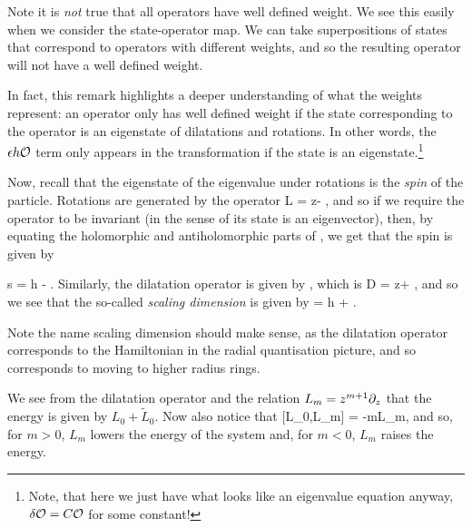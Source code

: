 \br 
Note it is \textit{not} true that all operators have well defined weight. We see this easily when we consider the state-operator map. We can take superpositions of states that correspond to operators with different weights, and so the resulting operator will not have a well defined weight. 
\er 

In fact, this remark highlights a deeper understanding of what the weights represent: an operator only has well defined weight if the state corresponding to the operator is an eigenstate of dilatations and rotations. In other words, the $\epsilon h\mathcal{O}$ term only appears in the transformation if the state is an eigenstate.\footnote{Note, that here we just have what looks like an eigenvalue equation anyway, $\delta \mathcal{O} = C\mathcal{O}$ for some constant!} 

Now, recall that the eigenstate of the eigenvalue under rotations is the \textit{spin} of the particle. Rotations are generated by the operator 
\bse 
    L = z\p - \overline{\p},
\ese 
and so if we require the operator to be invariant (in the sense of its state is an eigenvector), then, by equating the holomorphic and antiholomorphic parts of , we get that the spin is given by

\be 
\label{eqn:SpinWeights}
    s = h - .
\ee 
Similarly, the dilatation operator is given by , which is 
\bse 
    D = z\p + \overline{\p},
\ese
and so we see that the so-called \textit{scaling dimension} is given by 
\be 
\label{eqn:ScalingDimension}
    \Delta = h + .
\ee 

\br 
Note the name scaling dimension should make sense, as the dilatation operator corresponds to the Hamiltonian in the radial quantisation picture, and so corresponds to moving to higher radius rings. 
\er 

\br 
We see from the dilatation operator and the relation $L_m = z^{m+1}\partial_z$ that the energy is given by $L_0 +\widetilde{L}_0$. Now also notice that 
\be 
\label{eqn:L0LmCommutator}
    [L_0,L_m] = -mL_m,
\ee 
and so, for $m>0$, $L_m$ lowers the energy of the system and, for $m<0$, $L_m$ raises the energy.
\er 

